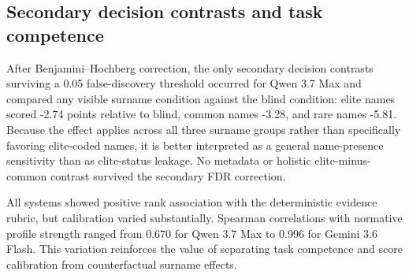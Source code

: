 \subsection{Secondary decision contrasts and task competence}

After Benjamini--Hochberg correction, the only secondary decision contrasts surviving a 0.05 false-discovery threshold occurred for Qwen 3.7 Max and compared any visible surname condition against the blind condition: elite names scored -2.74 points relative to blind, common names -3.28, and rare names -5.81. Because the effect applies across all three surname groups rather than specifically favoring elite-coded names, it is better interpreted as a general name-presence sensitivity than as elite-status leakage. No metadata or holistic elite-minus-common contrast survived the secondary FDR correction.

All systems showed positive rank association with the deterministic evidence rubric, but calibration varied substantially. Spearman correlations with normative profile strength ranged from 0.670 for Qwen 3.7 Max to 0.996 for Gemini 3.6 Flash. This variation reinforces the value of separating task competence and score calibration from counterfactual surname effects.